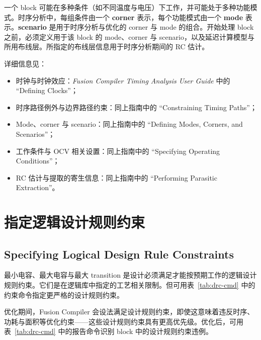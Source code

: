 一个 block 可能在多种条件（如不同温度与电压）下工作，并可能处于多种功能模式。时序分析中，每组条件由一个 \textbf{corner} 表示，每个功能模式由一个 \textbf{mode} 表示。\textbf{scenario} 是用于时序分析与优化的 corner 与 mode 的组合。开始处理 block 之前，必须定义用于该 block 的 mode、corner 与 scenario，以及延迟计算模型与所用布线层。所指定的布线层信息用于时序分析期间的 RC 估计。

详细信息见：
\begin{itemize}
  \item 时钟与时钟效应：\textit{Fusion Compiler Timing Analysis User Guide} 中的 ``Defining Clocks''；
  \item 时序路径例外与边界路径约束：同上指南中的 ``Constraining Timing Paths''；
  \item Mode、corner 与 scenario：同上指南中的 ``Defining Modes, Corners, and Scenarios''；
  \item 工作条件与 OCV 相关设置：同上指南中的 ``Specifying Operating Conditions''；
  \item RC 估计与提取的寄生信息：同上指南中的 ``Performing Parasitic Extraction''。
\end{itemize}

\section{指定逻辑设计规则约束}
\subsection*{Specifying Logical Design Rule Constraints}

最小电容、最大电容与最大 transition 是设计必须满足才能按预期工作的逻辑设计规则约束。它们是在逻辑库中指定的工艺相关限制。但可用表~\ref{tab:drc-cmd} 中的约束命令指定更严格的设计规则约束。

优化期间，Fusion Compiler 会设法满足设计规则约束，即使这意味着违反时序、功耗与面积等优化约束——这些设计规则约束具有更高优先级。优化后，可用表~\ref{tab:drc-cmd} 中的报告命令识别 block 中的设计规则约束违例。

